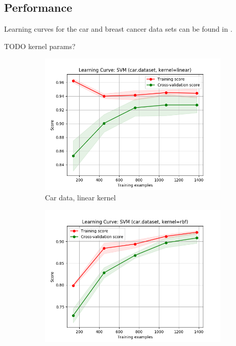 \documentclass{article}
\begin{document}
    \subsection{Performance}

    Learning curves for the car and breast cancer data sets can be found in .

    TODO kernel params?

    \begin{figure}[htb]
    \centering

    \begin{subfigure}{0.33\textwidth}
      \includegraphics[width=\linewidth]{out/svm/car-kernel-linear.png}
      \caption{Car data, linear kernel}
      \label{fig:svm-learning-1}
    \end{subfigure}\hfil
    \begin{subfigure}{0.33\textwidth}
      \includegraphics[width=\linewidth]{out/svm/car-kernel-rbf.png}

\end{subfigure}
\end{figure}
\end{document}
